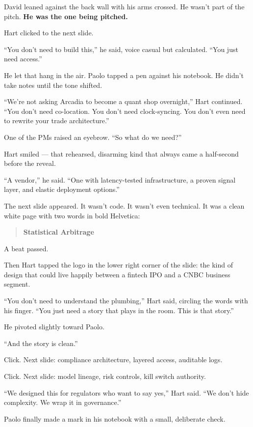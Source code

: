 \medskip

David leaned against the back wall with his arms crossed. He wasn’t part of the pitch. \textbf{He was the one being pitched.}

Hart clicked to the next slide.

“You don’t need to build this,” he said, voice casual but calculated.  
“You just need access.”

He let that hang in the air. Paolo tapped a pen against his notebook. He didn’t take notes 
until the tone shifted.

“We’re not asking Arcadia to become a quant shop overnight,” Hart continued.  
“You don’t need co-location. You don’t need clock-syncing. You don’t even need to rewrite your trade architecture.”

One of the PMs raised an eyebrow. “So what do we need?”

Hart smiled — that rehearsed, disarming kind that always came a half-second before the reveal.

“A vendor,” he said. “One with latency-tested infrastructure, a proven signal layer, and elastic deployment options.”

The next slide appeared. It wasn’t code. It wasn’t even technical.  
It was a clean white page with two words in bold Helvetica:

\begin{quote}
\centering
\textbf{Statistical Arbitrage}
\end{quote}

A beat passed.

Then Hart tapped the logo in the lower right corner of the slide:  the kind of 
design that could live happily between a fintech IPO and a CNBC business segment.

“You don’t need to understand the plumbing,” Hart said, circling the words with his finger.  
“You just need a story that plays in the room. This is that story.”

He pivoted slightly toward Paolo.

“And the story is clean.”  

Click. Next slide: compliance architecture, layered access, auditable logs.  

Click. Next slide: model lineage, risk controls, kill switch authority.

“We designed this for regulators who want to say yes,” Hart said. “We don’t hide complexity. We wrap it in governance.”

Paolo finally made a mark in his notebook with a small, deliberate check. 

